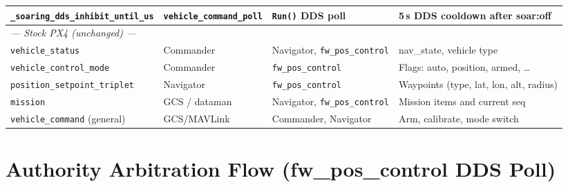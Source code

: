 \documentclass[11pt,a4paper]{article}
\begin{document}
\begin{center}
\begin{tabular}{p{4.8cm}p{2.8cm}p{2.8cm}p{5.5cm}}
\texttt{\_soaring\_dds\_inhibit\_until\_us} & \texttt{vehicle\_command\_poll} & \texttt{Run()} DDS poll & 5\,s DDS cooldown after soar:off \\
\midrule
\multicolumn{4}{l}{\textit{--- Stock PX4 (unchanged) ---}} \\
\texttt{vehicle\_status} & Commander & Navigator, \texttt{fw\_pos\_control} & nav\_state, vehicle type \\
\texttt{vehicle\_control\_mode} & Commander & \texttt{fw\_pos\_control} & Flags: auto, position, armed, … \\
\texttt{position\_setpoint\_triplet} & Navigator & \texttt{fw\_pos\_control} & Waypoints (type, lat, lon, alt, radius) \\
\texttt{mission} & GCS / dataman & Navigator, \texttt{fw\_pos\_control} & Mission items and current seq \\
\texttt{vehicle\_command} (general) & GCS/MAVLink & Commander, Navigator & Arm, calibrate, mode switch \\
\bottomrule
\end{tabular}
\end{center}

\newpage

\section*{Authority Arbitration Flow (fw\_pos\_control DDS Poll)}
\end{document}
